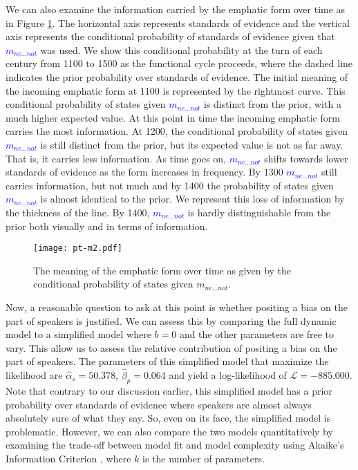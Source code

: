 \documentclass[linguex]{sp}
\theoremstyle{definition} \newtheorem{definition}{Definition}
\begin{document}
We can also examine the information carried by the emphatic form over time as in Figure \ref{m2-meaning}. The horizontal axis represents standards of evidence and the vertical axis represents the conditional probability of standards of evidence given that \emph{\textcolor{blue}{$m_{ne...not}$}} was used. We show this conditional probability at the turn of each century from 1100 to 1500 as the functional cycle proceeds, where the dashed line indicates the prior probability over standards of evidence.  The initial meaning of the incoming emphatic form at 1100 is represented by the rightmost curve. This conditional probability of states given \emph{\textcolor{blue}{$m_{ne...not}$}} is distinct from the prior, with a much higher expected value. At this point in time the incoming emphatic form carries the most information. At 1200, the conditional probability of states given \emph{\textcolor{blue}{$m_{ne...not}$}} is still distinct from the prior, but its expected value is not as far away. That is, it carries less information. As time goes on, \emph{\textcolor{blue}{$m_{ne...not}$}}  shifts towards lower standards of evidence as the form increases in frequency. By 1300 \emph{\textcolor{blue}{$m_{ne...not}$}} still carries information, but not much and by 1400 the probability of states given \emph{\textcolor{blue}{$m_{ne...not}$}} is almost identical to the prior. We represent this loss of information by the thickness of the line. By 1400, \emph{\textcolor{blue}{$m_{ne...not}$}} is hardly distinguishable from the prior both visually and in terms of information.

\begin{figure}
\centering
     \texttt{[image: pt-m2.pdf]}
\caption{The meaning of the emphatic form over time as given by the conditional probability of states given \textit{\color{blue} $m_{ne...not}$}.}
\label{m2-meaning}
\end{figure}

Now, a reasonable question to ask at this point is whether positing a bias on the part of speakers is justified. We can assess this by comparing the full dynamic model to a simplified model where $b=0$ and the other parameters are free to vary. This allow us to assess the relative contribution of positing a bias on the part of speakers.  The parameters of this simplified model that maximize the likelihood are $\hat{\alpha}_{s} = 50.378$, $\hat{\beta}_p =   0.064$ and yield a log-likelihood of $\mathcal{L} = -885.000$. Note that contrary to our discussion earlier, this simplified model has a prior probability over standards of evidence where speakers are almost always absolutely sure of what they say. So, even on its face, the simplified model is problematic. However, we can also compare the two models quantitatively by examining the trade-off between model fit and model complexity using Akaike's Information Criterion \citep{akaike1974}, where $k$ is the number of parameters. 
 
\end{document}
